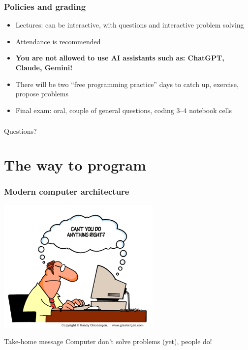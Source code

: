 \documentclass{beamer}
\begin{document}
\begin{frame}[fragile]
  \frametitle{Policies and grading}
  \begin{itemize}
  \item Lectures: can be interactive, with questions and  interactive problem solving\pause
  \item Attendance is recommended\pause
  \item \textbf{You are not allowed to use AI assistants such as: ChatGPT, Claude, Gemini!}\pause
  \item There will be two ``free programming practice'' days to catch up, exercise, propose problems\pause
  \item Final exam: oral, couple of general questions, coding 3--4 notebook cells 
  \end{itemize}
\end{frame}

\begin{frame}
   \frametitle{}
   \begin{center}
   Questions?
   \end{center}
\end{frame}

\section{The way to program}
\begin{frame}[fragile]
  \frametitle{Modern computer architecture}
  \begin{center}
  \includegraphics[width=0.6\textwidth]{computer_comic.png}
  \end{center}
  \begin{block}{Take-home message}
  Computer don't solve problems (yet), people do!
  \end{block}
\end{frame}
\end{document}

